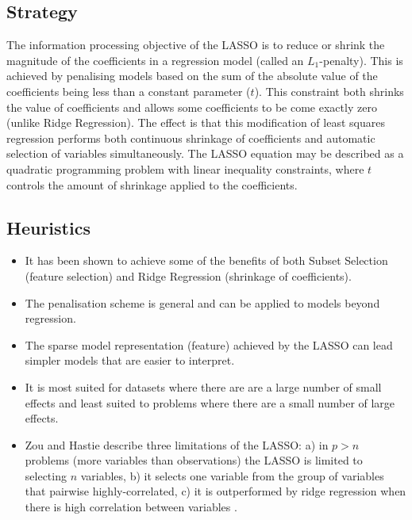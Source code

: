 \subsection{Strategy}
The information processing objective of the LASSO is to reduce or shrink the magnitude of the coefficients in a regression model (called an $L_1$-penalty).
This is achieved by penalising models based on the sum of the absolute value of the coefficients being less than a constant parameter ($t$). This constraint both shrinks the value of coefficients and allows some coefficients to be come exactly zero (unlike Ridge Regression). The effect is that this modification of least squares regression performs both continuous shrinkage of coefficients and automatic selection of variables simultaneously. The LASSO equation may be described as a quadratic programming problem with linear inequality constraints, where $t$ controls the amount of shrinkage applied to the coefficients.

\subsection{Heuristics}

\begin{itemize}
	\item It has been shown to achieve some of the benefits of both Subset Selection (feature selection) and Ridge Regression (shrinkage of coefficients).
	\item The penalisation scheme is general and can be applied to models beyond regression.
	\item The sparse model representation (feature) achieved by the LASSO can lead simpler models that are easier to interpret. 
	\item It is most suited for datasets where there are are a large number of small effects and least suited to problems where there are a small number of large effects.  
	\item Zou and Hastie describe three limitations of the LASSO: a) in $p>n$ problems (more variables than observations) the LASSO is limited to selecting $n$ variables, b) it selects one variable from the group of variables that pairwise highly-correlated, c) it is outperformed by ridge regression when there is high correlation between variables \cite{Zou2005}.
\end{itemize}

